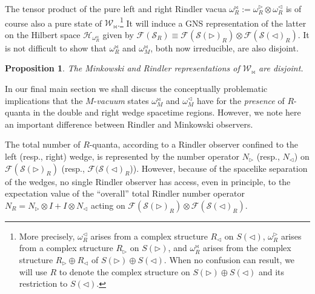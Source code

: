 \documentclass[12pt]{article}
\newtheorem{prop}{Proposition}
\theoremstyle{remark}
\theoremstyle{definition}
\newcommand{\alg}[1]{\mathcal{#1}}
\newcommand{\hil}[1]{\mathcal{#1}}
\begin{document}
The tensor product of the pure left and right Rindler vacua
$\omega_{R}^{\bowtie}:=\omega ^{\triangleright}_{R} \otimes \omega
^{\triangleleft}_{R}$ is of course also a pure state of
$\alg{W}_{\bowtie}$.\footnote{More precisely, $\omega
  _{R}^{\triangleleft}$ arises from a complex structure
  $R_{\triangleleft}$ on $S(\triangleleft )$, $\omega
  _{R}^{\triangleright}$ arises from a complex structure
  $R_{\triangleright}$ on $S(\triangleright )$, and $\omega
  _{R}^{\bowtie}$ arises from the complex structure $R_{\triangleright
    }\oplus R_{\triangleleft}$ of $S(\triangleright)\oplus
  S(\triangleleft)$.  When no confusion can result, we will use $R$ to
  denote the complex structure on $S(\triangleright)\oplus
  S(\triangleleft)$ and its restriction to $S(\triangleleft )$.}  It
will induce a GNS representation of the latter on the Hilbert space
$\hil{H}_{\omega _{R}^{\bowtie}}$ given by $\hil{F}(\hil{S}_{R})\equiv
\hil{F}(\hil{S}(\triangleright)_{R})\otimes
\hil{F}(\hil{S}(\triangleleft)_{R})$. It is not difficult to show that
$\omega_{R}^{\bowtie}$ and $\omega _{M}^{\bowtie}$, both now
irreducible, are also disjoint.

\begin{prop} \label{disjoint2} The Minkowski and Rindler representations of 
$\alg{W}_{\bowtie}$ are disjoint.  \end{prop}

In our final main section we shall discuss the conceptually
problematic implications that the $M$-\emph{vacuum} states
$\omega_{M}^{\bowtie}$ and $\omega_{M}^{\triangleleft}$ have for the
\emph{presence} of $R$-quanta in the double and right wedge spacetime
regions.  However, we note here an important difference between
Rindler and Minkowski observers.

The total number of $R$-quanta, according to a Rindler observer
confined to the left (resp., right) wedge, is represented by the
number operator $N_{\triangleright}$ (resp., $N_{\triangleleft}$) on
$\hil{F}(\hil{S}(\triangleright)_{R})$ (resp.,
$\hil{F}(\hil{S}(\triangleleft)_{R}$)).  However, because of the
spacelike separation of the wedges, no single Rindler observer has
access, even in principle, to the expectation value of the ``overall''
total Rindler number operator $N_{R}=N_{\triangleright}\otimes
I+I\otimes N_{\triangleleft}$ acting on
$\hil{F}(\hil{S}(\triangleright)_{R})\otimes
\hil{F}(\hil{S}(\triangleleft)_{R})$.
\end{document}

